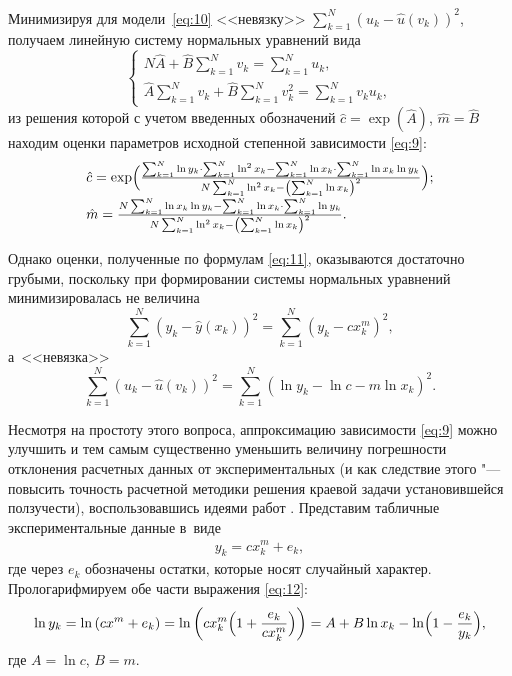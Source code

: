 Минимизируя для модели~\eqref{eq:10} <<невязку>> $\sum  _{k=1}^{N} (u_k - \hat{u}(v_k))^2$, получаем линейную систему нормальных уравнений вида
\begin{equation*} 
 \begin{cases}
   N \hat{A} + \hat{B} \sum  _{k=1}^{N} v_k = \sum  _{k=1}^{N} u_k,	\\
   \hat{A} \sum  _{k=1}^{N} v_k + \hat{B} \sum  _{k=1}^{N} v^2_k = \sum  _{k=1}^{N} v_k u_k,
 \end{cases}
\end{equation*}
из решения которой с учетом введенных обозначений $\hat{c}=\exp(\hat{A})$, $\hat{m}=\hat{B}$ находим оценки параметров исходной степенной зависимости \eqref{eq:9}:
\begin{align}	\label{eq:11}
\begin{array}{l} 															
		\hat{c} = \exp \Bigl( \frac{\sum  _{k=1}^{N} \ln y_k \cdot \sum  _{k=1}^{N} \ln^2 x_k - \sum  _{k=1}^{N} \ln x_k \cdot \sum  _{k=1}^{N} \ln x_k \ln y_k}  {N \sum  _{k=1}^{N} \ln^2 x_k - \left(\sum  _{k=1}^{N} \ln x_k\right)^2} \Bigr);	\\[3mm]
		\hat{m} = \frac{N \sum  _{k=1}^{N} \ln x_k \ln y_k - \sum  _{k=1}^{N} \ln x_k \cdot \sum  _{k=1}^{N} \ln y_k} {N \sum  _{k=1}^{N} \ln^2 x_k - \left(\sum  _{k=1}^{N} \ln x_k\right)^2}.
	\end{array}
\end{align}

Однако оценки, полученные по формулам \eqref{eq:11}, оказываются достаточно грубыми, поскольку при формировании системы нормальных уравнений минимизировалась не величина 
$$\sum  _{k=1}^{N} (y_k - \hat{y}(x_k))^2=\sum  _{k=1}^{N} \left(y_k - c x^m_k\right)^2,$$ а~<<невязка>> 
$$\sum  _{k=1}^{N} (u_k - \hat{u}(v_k))^2 = \sum  _{k=1}^{N} (\ln y_k - \ln c - m \ln x_k)^2.$$

Несмотря на простоту этого вопроса, аппроксимацию зависимости \eqref{eq:9} можно улучшить и тем самым существенно уменьшить величину погрешности отклонения расчетных данных от экспериментальных (и как следствие этого "--- повысить точность расчетной методики решения краевой задачи установившейся ползучести), воспользовавшись идеями работ \cite{Zoteev, ZoteevMakarov}. Представим табличные экспериментальные данные в~виде 
\begin{gather} \label{eq:12}
	y_k=c x^m_k +e_k, 
\end{gather}
где через $e_k$ обозначены остатки, которые носят случайный характер.
Прологарифмируем обе части выражения \eqref{eq:12}:
\begin{gather*}
	\ln y_k = \ln \left(c x^m +e_k\right) = \ln \left( c x^m_k \Bigl(1+\frac{e_k}{c x^m_k}\Bigr) \right) = A + B \ln x_k - \ln \Bigl(1-\frac{e_k}{y_k}\Bigr),
\end{gather*}
где $A=\ln c$, $B=m$.

